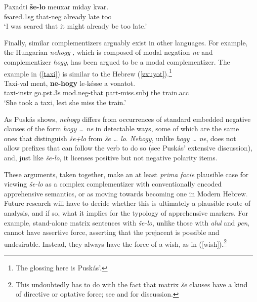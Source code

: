 \documentclass[output=paper,colorlinks,citecolor=brown]{langscibook}
\begin{document}
\ea
\label{selo-kvar}
\gll Paxadti \textbf{še-lo} meuxar miday kvar. \\
feared.{\sc 1sg} that-{\sc neg} already late too \\
\glt `I was scared that it might already be too late.'
\z


Finally, similar complementizers arguably exist in other languages. For example, the Hungarian \textit{nehogy} \citep{szabolcsi02, puskas17}, which is composed of modal negation \textit{ne} and complementizer \textit{hogy}, has been argued to be a modal complementizer. The example in (\ref{taxi}) is similar to the Hebrew (\ref{zxuyot}).\footnote{The glossing here is Pusk\'{a}s'.} 
\ea
\label{taxi}   \\
\gll  Taxi-val ment, \textbf{ne-hogy}  le-k\'{e}sse a vonatot. \\
taxi-{\sc instr} go.{\sc pst.3s} {\sc mod}.{\sc neg}-that {\sc part}-miss.{\sc subj} the train.{\sc acc}  \\

\glt `She took a taxi, lest she miss the train.'
\z

As Pusk\'{a}s shows, \textit{nehogy} differs from occurrences of standard embedded negative clauses of the form \textit{hogy {\ldots} ne} in detectable ways, some of which are the same ones that distinguish \textit{še+lo} from \textit{še {\ldots} lo}. \textit{Nehogy}, unlike \textit{hogy {\ldots} ne}, does not allow prefixes that can follow the verb to do so (see Pusk\'{a}s' extensive discussion), and, just like \textit{še-lo}, it licenses positive but not negative polarity items.

These arguments, taken together, make an at least \textit{prima facie} plausible case for viewing \textit{še-lo} as a complex complementizer with conventionally encoded apprehensive semantics, or as moving towards becoming one in Modern Hebrew. Future research will have to decide whether this is ultimately a plausible route of analysis, and if so, what it implies for the typology of apprehensive markers. For example, stand-alone matrix sentences with \textit{še-lo}, unlike those with \textit{alul} and \textit{pen}, cannot have assertive force, asserting that the prejacent is possible and undesirable. Instead, they always have the force of a wish, as in (\ref{wish}).\footnote{This undoubtedly has to do with the fact that matrix \textit{še} clauses have a kind of directive or optative force; see \citet{schwarzwald-shlomo} and \citet{francez-JJL} for discussion.}
\end{document}
